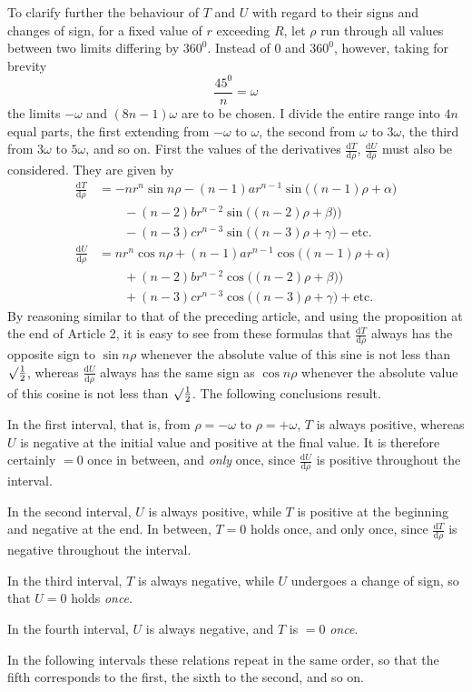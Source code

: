 To clarify further the behaviour of $T$ and $U$ with regard to their signs and changes of sign, for a fixed value of $r$ exceeding $R$, let $\rho$ run through all values between two limits differing by $360^0$. Instead of $0$ and $360^0$, however, taking for brevity
\[
\frac{45^0}{n}=\omega
\]
the limits $-\omega$ and $(8n-1)\omega$ are to be chosen. I divide the entire range into $4n$ equal parts, the first extending from $-\omega$ to $\omega$, the second from $\omega$ to $3\omega$, the third from $3\omega$ to $5\omega$, and so on. First the values of the derivatives $\frac{\mathrm{d}T}{\mathrm{d}\rho}$, $\frac{\mathrm{d}U}{\mathrm{d}\rho}$ must also be considered. They are given by
\[
\begin{array}{rl}
\frac{\mathrm{d}T}{\mathrm{d}\rho}
&=-nr^n\sin n\rho-(n-1)ar^{n-1}\sin\bigl((n-1)\rho+\alpha\bigr)\\
&\qquad -(n-2)br^{n-2}\sin\bigl((n-2)\rho+\beta)\bigr)\\
&\qquad -(n-3)cr^{n-3}\sin\bigl((n-3)\rho+\gamma\bigr)-\mathrm{etc.}\\
\frac{\mathrm{d}U}{\mathrm{d}\rho}
&=nr^n\cos n\rho+(n-1)ar^{n-1}\cos\bigl((n-1)\rho+\alpha\bigr)\\
&\qquad +(n-2)br^{n-2}\cos\bigl((n-2)\rho+\beta)\bigr)\\
&\qquad +(n-3)cr^{n-3}\cos\bigl((n-3)\rho+\gamma\bigr)+\mathrm{etc.}
\end{array}
\]
By reasoning similar to that of the preceding article, and using the proposition at the end of Article 2, it is easy to see from these formulas that $\frac{\mathrm{d}T}{\mathrm{d}\rho}$ always has the opposite sign to $\sin n\rho$ whenever the absolute value of this sine is not less than $\surd\frac{1}{2}$, whereas $\frac{\mathrm{d}U}{\mathrm{d}\rho}$ always has the same sign as $\cos n\rho$ whenever the absolute value of this cosine is not less than $\surd\frac{1}{2}$. The following conclusions result.

In the first interval, that is, from $\rho=-\omega$ to $\rho=+\omega$, $T$ is always positive, whereas $U$ is negative at the initial value and positive at the final value. It is therefore certainly $=0$ once in between, and \emph{only} once, since $\frac{\mathrm{d}U}{\mathrm{d}\rho}$ is positive throughout the interval.

In the second interval, $U$ is always positive, while $T$ is positive at the beginning and negative at the end. In between, $T=0$ holds once, and only once, since $\frac{\mathrm{d}T}{\mathrm{d}\rho}$ is negative throughout the interval.

In the third interval, $T$ is always negative, while $U$ undergoes a change of sign, so that $U=0$ holds \emph{once}.

In the fourth interval, $U$ is always negative, and $T$ is $=0$ \emph{once}.

In the following intervals these relations repeat in the same order, so that the fifth corresponds to the first, the sixth to the second, and so on.

